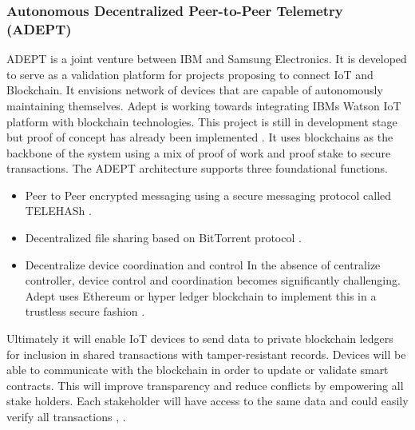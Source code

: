 \subsubsection{Autonomous Decentralized Peer-to-Peer Telemetry (ADEPT)} \label{Adept}
ADEPT is a joint venture between IBM and Samsung Electronics. It is developed to serve as a validation platform for projects proposing to connect IoT and Blockchain. It envisions network of devices that are capable of autonomously maintaining themselves. Adept is working towards integrating IBMs Watson IoT platform with blockchain technologies. This project is still in development stage but proof of concept has already been implemented \cite{misc:005}. It uses blockchains as the backbone of the system using a mix of proof of work and proof stake to secure transactions. The ADEPT architecture supports three foundational functions.
\begin{itemize}
  \item Peer to Peer encrypted messaging using a secure messaging protocol called TELEHASh \cite{misc:005}.
  \item Decentralized file sharing based on BitTorrent protocol \cite{misc:005}.
\item Decentralize device coordination and control
In the absence of centralize controller, device control and coordination becomes significantly challenging. Adept uses Ethereum or hyper ledger blockchain to implement this in a trustless secure fashion \cite{misc:005}.

\end{itemize}
Ultimately it will enable IoT devices to send data to private blockchain ledgers for inclusion in shared transactions with tamper-resistant records. Devices will be able to communicate with the blockchain in order to update or validate smart contracts. This will improve transparency and reduce conflicts by empowering all stake holders. Each stakeholder will have access to the same data and could easily verify all transactions \cite{misc:005}, \cite{misc:004}. 
\vspace{0.5cm}  
